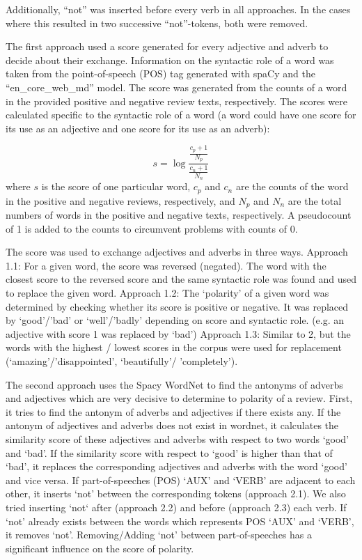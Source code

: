 \documentclass[11pt,a4paper]{article}
\begin{document}
Additionally, ``not'' was inserted before every verb in all approaches. In the cases where this resulted in two successive ``not''-tokens, both were removed.

The first approach used a score generated for every adjective and adverb to decide about their exchange. Information on the syntactic role of a word was taken from the point-of-speech (POS) tag generated with spaCy \cite{spacy2} and the ``en\_core\_web\_md'' model. The score was generated from the counts of a word in the provided positive and negative review texts, respectively. The scores were calculated specific to the syntactic role of a word (a word could have one score for its use as an adjective and one score for its use as an adverb):

\begin{equation}
s=\log\frac{\frac{c_p+1}{N_p}}{\frac{c_n+1}{N_n}}
\end{equation}
where $s$ is the score of one particular word, $c_p$  and $c_n$ are the counts of the word in the positive and negative reviews, respectively, and $N_p$ and $N_n$ are the total numbers of words in the positive and negative texts, respectively. A pseudocount of 1 is added to the counts to circumvent problems with counts of 0.

The score was used to exchange adjectives and adverbs in three ways. Approach 1.1: For a given word, the score was reversed (negated). The word with the closest score to the reversed score and the same syntactic role was found and used to replace the given word. Approach 1.2: The ‘polarity’ of a given word was determined by checking whether its score is positive or negative. It was replaced by ‘good’/’bad’ or ‘well’/’badly’ depending on score and syntactic role. (e.g. an adjective with score 1 was replaced by ‘bad’) Approach 1.3: Similar to 2, but the words with the highest / lowest scores in the corpus were used for replacement (‘amazing’/’disappointed’, ‘beautifully’/ ’completely’).

The second approach uses the Spacy WordNet \cite{miller1995wordnet} \cite{miller1998wordnet} to find the antonyms of adverbs and adjectives which are very decisive to determine to polarity of a review. First, it tries to find the antonym of adverbs and adjectives if there exists any. If the antonym of adjectives and adverbs does not exist in wordnet, it calculates the similarity score of these adjectives and adverbs with respect to two words ‘good’ and ‘bad’. If the similarity score with respect to ‘good’ is higher than that of ‘bad’, it replaces the corresponding adjectives and adverbs with the word ‘good’ and vice versa.
If part-of-speeches (POS) ‘AUX’ and ‘VERB’ are adjacent to each other, it inserts ‘not’ between the corresponding tokens (approach 2.1). We also tried inserting ‘not‘ after (approach 2.2) and before (approach 2.3) each verb. If ‘not’ already exists between the words which represents POS ‘AUX’ and ‘VERB’, it removes ‘not’. Removing/Adding ‘not’ between part-of-speeches has a significant influence on the score of polarity.
\end{document}
